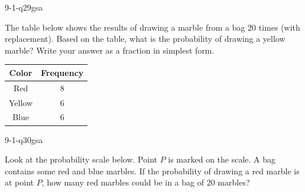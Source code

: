 \begin{practiceQuestion}{9-1-q29}{gsa}
\begin{questionText}
The table below shows the results of drawing a marble from a bag $20$ times (with replacement). Based on the table, what is the probability of drawing a yellow marble? Write your answer as a fraction in simplest form.

\begin{center}
\begin{tabular}{|c|c|}
\hline
\textbf{Color} & \textbf{Frequency} \\
\hline
Red & $8$ \\
\hline
Yellow & $6$ \\
\hline
Blue & $6$ \\
\hline
\end{tabular}
\end{center}
\end{questionText}
\end{practiceQuestion}

\begin{practiceQuestion}{9-1-q30}{gsa}
\begin{questionText}
Look at the probability scale below. Point $P$ is marked on the scale. A bag contains some red and blue marbles. If the probability of drawing a red marble is at point $P$, how many red marbles could be in a bag of $20$ marbles?

\begin{center}
\end{center}
\end{questionText}
\end{practiceQuestion}
